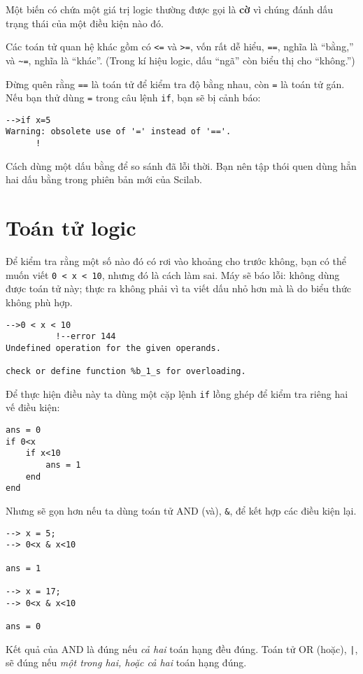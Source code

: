\documentclass[12pt]{book}
\begin{document}
Một biến có chứa một giá trị logic thường được gọi là {\bf cờ}
vì chúng đánh dấu trạng thái của một điều kiện nào đó.

Các toán tử quan hệ khác gồm có {\tt <=} và {\tt >=}, vốn
rất dễ hiểu, {\tt ==}, nghĩa là ``bằng,'' và
\verb+~=+, nghĩa là ``khác''.  (Trong kí hiệu logic, dấu ``ngã''
còn biểu thị cho ``không.'')

Đừng quên rằng {\tt ==} là toán tử để kiểm tra độ bằng nhau, còn
{\tt =} là toán tử gán. Nếu bạn thử dùng {\tt =} trong
câu lệnh {\tt if}, bạn sẽ bị cảnh báo:

\begin{verbatim}
-->if x=5
Warning: obsolete use of '=' instead of '=='.
      !
\end{verbatim}
%
Cách dùng một dấu bằng để so sánh đã lỗi thời. Bạn nên tập thói quen
dùng hẳn hai dấu bằng trong phiên bản mới của Scilab.


\section{Toán tử logic}
\label{logop}

Để kiểm tra rằng một số nào đó có rơi vào khoảng cho trước không,
bạn có thể muốn viết {\tt 0 < x < 10}, nhưng đó là cách làm sai.
Máy sẽ báo lỗi: không dùng được toán tử này; thực ra không phải 
vì ta viết dấu nhỏ hơn mà là do biểu thức không phù hợp.

\begin{verbatim}
-->0 < x < 10
          !--error 144 
Undefined operation for the given operands.

check or define function %b_1_s for overloading.
\end{verbatim}
%

Để thực hiện điều này ta dùng một cặp lệnh {\tt if} 
lồng ghép để kiểm tra riêng hai vế điều kiện:

\begin{verbatim}
ans = 0
if 0<x
    if x<10
        ans = 1
    end
end
\end{verbatim}
%
Nhưng sẽ gọn hơn nếu ta dùng toán tử AND (và), {\tt \&}, 
để kết hợp các điều kiện lại.

\begin{verbatim}
--> x = 5;
--> 0<x & x<10

ans = 1

--> x = 17;
--> 0<x & x<10

ans = 0
\end{verbatim}
%
Kết quả của AND là đúng nếu {\em cả hai} toán hạng đều đúng.
Toán tử OR (hoặc), {\tt |}, sẽ đúng nếu 
{\em một trong hai, hoặc cả hai} toán hạng đúng.
\end{document}
